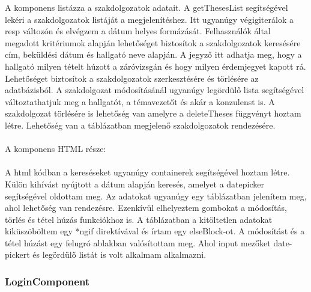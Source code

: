 A komponens listázza a szakdolgozatok adatait. A getThesesList segítségével lekéri a szakdolgozatok listáját a megjelenítéshez. Itt ugyanúgy végigiterálok a resp változón és elvégzem a dátum helyes formázását. Felhasználók által megadott kritériumok alapján lehetőséget biztosítok a szakdolgozatok keresésére cím, beküldési dátum és hallgató neve alapján. A jegyző itt adhatja meg, hogy a hallgató milyen tételt húzott a záróvizsgán és hogy milyen érdemjegyet kapott rá. Lehetőséget biztosítok a szakdolgozatok szerkesztésére és törlésére az adatbázisból. A szakdolgozat módosításánál ugyanúgy legördülő lista segítségével változtathatjuk meg a hallgatót, a témavezetőt és akár a konzulenst is. A szakdolgozat törlésére is lehetőség van amelyre a deleteTheses függvényt hoztam létre. Lehetőség van a táblázatban megjelenő szakdolgozatok rendezésére. \\
\\
A komponens HTML része:\\
\\
A html kódban a kereséseket ugyanúgy containerek segítségével hoztam létre.
Külön kihívást nyújtott a dátum alapján keresés, amelyet a datepicker segítségével oldottam meg. Az adatokat ugyanúgy egy táblázatban jelenítem meg, ahol lehetőség van rendezésre. Ezenkívül elhelyeztem gombokat a módosítás, törlés és tétel húzás funkciókhoz is. A táblázatban a kitöltetlen adatokat kiküszöböltem egy *ngif direktívával és írtam egy elseBlock-ot. A módosítást és a tétel húzást egy felugró ablakban valósítottam meg. Ahol input mezőket date-pickert és legördülő listát is volt alkalmam alkalmazni.


\subsubsection{LoginComponent}

